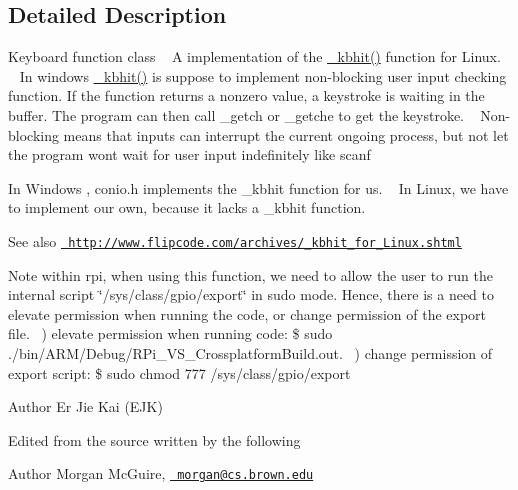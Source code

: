 \subsection{Detailed Description}
Keyboard function class ~\newline
 A implementation of the \mbox{\hyperlink{class_keyboard_functions_abead7b07445b65c4b01d613823d2f8ce}{\+\_\+kbhit()}} function for Linux. ~\newline
In windows \mbox{\hyperlink{class_keyboard_functions_abead7b07445b65c4b01d613823d2f8ce}{\+\_\+kbhit()}} is suppose to implement non-\/blocking user input checking function. If the function returns a nonzero value, a keystroke is waiting in the buffer. The program can then call \+\_\+getch or \+\_\+getche to get the keystroke. ~\newline
Non-\/blocking means that inputs can interrupt the current ongoing process, but not let the program wont wait for user input indefinitely like scanf

In Windows , conio.\+h implements the \+\_\+kbhit function for us. ~\newline
In Linux, we have to implement our own, because it lacks a \+\_\+kbhit function. \begin{DoxySeeAlso}{See also}
\href{http://www.flipcode.com/archives/_kbhit_for_Linux.shtml}{\texttt{ http\+://www.\+flipcode.\+com/archives/\+\_\+kbhit\+\_\+for\+\_\+\+Linux.\+shtml}}
\end{DoxySeeAlso}
\begin{DoxyNote}{Note}
within rpi, when using this function, we need to allow the user to run the internal script \char`\"{}/sys/class/gpio/export\char`\"{} in sudo mode. Hence, there is a need to elevate permission when running the code, or change permission of the export file. ~) elevate permission when running code\+: \$ sudo ./bin/\+A\+R\+M/\+Debug/\+R\+Pi\+\_\+\+V\+S\+\_\+\+Crossplatform\+Build.out. ~) change permission of export script\+: \$ sudo chmod 777 /sys/class/gpio/export
\end{DoxyNote}
\begin{DoxyAuthor}{Author}
Er Jie Kai (E\+JK)
\end{DoxyAuthor}
Edited from the source written by the following \begin{DoxyAuthor}{Author}
Morgan Mc\+Guire, \href{mailto:morgan@cs.brown.edu}{\texttt{ morgan@cs.\+brown.\+edu}} 
\end{DoxyAuthor}


